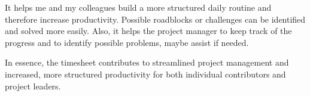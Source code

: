 It helps me and my colleagues build a more structured daily routine and therefore increase productivity. Possible roadblocks or challenges can be identified and solved more easily.
Also, it helps the project manager to keep track of the progress and to identify possible problems, maybe assist if needed.

In essence, the timesheet contributes to streamlined project management and increased, more structured productivity for both individual contributors and project leaders.